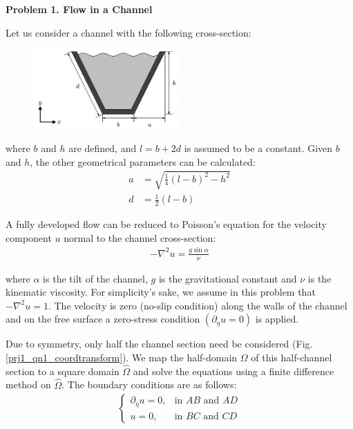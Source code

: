 \textbf{Problem 1. Flow in a Channel}

Let us consider a channel with the following cross-section:
\begin{figure}[h!]
\centering
\includegraphics[width=0.5\textwidth]{figures/prj1_qn1_channel.png}\\
\caption{}
\label{prj1_qn1_channel}
\end{figure}

where $b$ and $h$ are defined, and $l = b + 2d$ is assumed to be a constant.  Given $b$ and $h$, the other geometrical parameters can be calculated:
\begin{align}
    a &= \sqrt{\frac{1}{4}(l-b)^2-h^2} \\
    d &= \frac{1}{2}(l-b)
\end{align}

A fully developed flow can be reduced to Poisson's equation for the velocity component $u$ normal to the channel cross-section:
\begin{align}
    -\nabla^2u = \frac{g\sin\alpha}{\nu}
    \label{poisson}
\end{align}

where $\alpha$ is the tilt of the channel, $g$ is the gravitational constant and $\nu$ is the kinematic viscosity.  For simplicity's sake, we assume in this problem that $-\nabla^2u = 1$.  The velocity is zero (no-slip condition) along the walls of the channel and on the free surface a zero-stress condition $(\partial_\eta u = 0)$ is applied.

Due to symmetry, only half the channel section need be considered (Fig. \ref{prj1_qn1_coordtransform}).  We map the half-domain $\Omega$ of this half-channel section to a square domain $\hat{\Omega}$ and solve the equations using a finite difference method on $\hat{\Omega}$.  The boundary conditions are as follows:
\begin{align}
    \begin{cases}
        \partial_\eta u = 0, & \text{in $AB$ and $AD$} \\
        u = 0, & \text{in $BC$ and $CD$}
    \end{cases}
\end{align}

